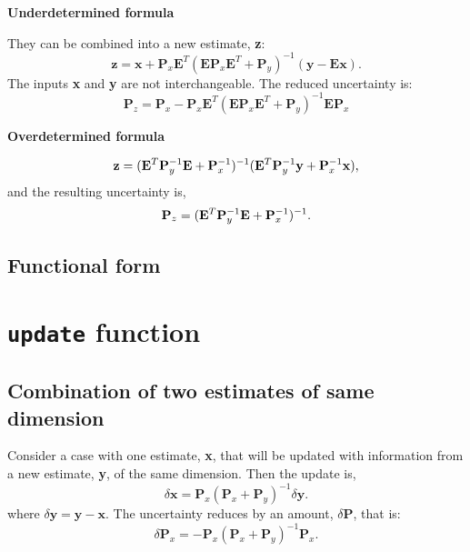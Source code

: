 \documentclass{article}
\begin{document}
\textbf{{Underdetermined formula}}

They can be combined into a new estimate, \textbf{z}:
\begin{equation}
\label{eq:15}
\mathbf{z} = \mathbf{x} + \mathbf{P}_x \mathbf{E}^T (\mathbf{E} \mathbf{P}_x \mathbf{E}^T + \mathbf{P}_y )^{-1} (\mathbf{y} - \mathbf{Ex}) .
\end{equation}
The inputs \textbf{x} and \textbf{y} are not interchangeable. The reduced uncertainty is:
\begin{equation}
\label{eq:16}
\mathbf{P}_{z} = \mathbf{P}_x - \mathbf{P}_x \mathbf{E}^T (\mathbf{E} \mathbf{P}_x \mathbf{E}^T + \mathbf{P}_y )^{-1} \mathbf{E} \mathbf{P}_x
\end{equation}

\textbf{{Overdetermined formula}}

\begin{equation}
\label{eq:18}
\mathbf{z} = ({\bf E}^T {\bf P}_y^{-1} {\bf E} + {\bf P}^{-1}_x)^{-1} ({\bf E}^T {\bf P}_y^{-1} {\bf y} + {\bf P}_x^{-1} {\bf x}),
\end{equation}
and the resulting uncertainty is,
\begin{equation}
\label{eq:19}
{\bf P}_{z} = ({\bf E}^T {\bf P}_y^{-1} {\bf E} + {\bf P}_{x}^{-1})^{-1}.
\end{equation}

\subsection{Functional form}
\label{sec:functional-form}

\section{\texttt{update} function}

\subsection{Combination of two estimates of same dimension}
\label{sec:basic-form}

Consider a case with one estimate, \textbf{x}, that will be updated with information from a new estimate, \textbf{y}, of the same dimension.
Then the update is,
\begin{equation}
\label{eq:15}
\delta\mathbf{x} = \mathbf{P}_x (\mathbf{P}_x + \mathbf{P}_y )^{-1} \delta\mathbf{y} .
\end{equation}
where $\delta \mathbf{y} = \mathbf{y} - \mathbf{x}$.
The uncertainty reduces by an amount, $\delta\mathbf{P}$, that is:
\begin{equation}
\label{eq:16}
\delta\mathbf{P}_{x} = - \mathbf{P}_x (\mathbf{P}_x + \mathbf{P}_y )^{-1} \mathbf{P}_x.
\end{equation}
\end{document}
